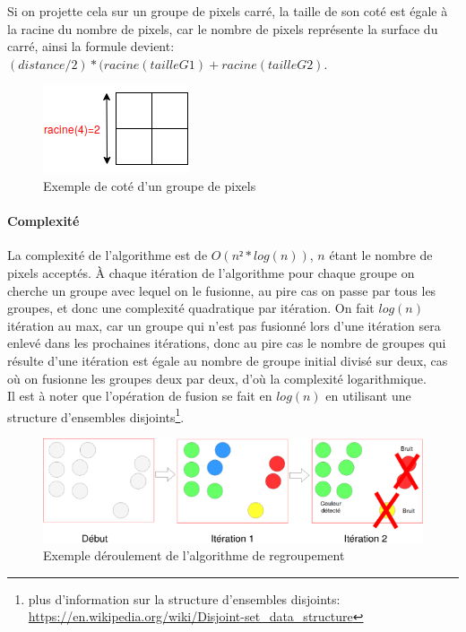 \documentclass[12pt]{report}
\begin{document}
	Si on projette cela sur un groupe de pixels carré, la taille de son coté est égale à la racine du nombre de pixels, car le nombre de pixels représente la surface du carré, ainsi la formule devient: \textbf{$(distance/2)*(racine(tailleG1)+racine(tailleG2)$}.
	\begin{figure}[H]
		\centering
		\includegraphics[scale=0.75]{imgs/GroupeSide.png}
		\caption{Exemple de coté d'un groupe de pixels}
		\label{fig:GroupeSide}
	\end{figure}
	\paragraph{Complexité}La complexité de l’algorithme est de $O(n²*log(n))$, $n$ étant le nombre de pixels acceptés. À chaque itération de l’algorithme pour chaque groupe on cherche un groupe avec lequel on le fusionne, au pire cas on passe par tous les groupes, et donc une complexité quadratique par itération. On fait $log(n)$ itération au max, car un groupe qui n’est pas fusionné lors d’une itération sera enlevé dans les prochaines itérations, donc au pire cas le nombre de groupes qui résulte d’une itération est égale au nombre de groupe initial divisé sur deux, cas où on fusionne les groupes deux par deux, d’où la complexité logarithmique.\\
	Il est à noter que l'opération de fusion se fait en $log(n)$ en utilisant une structure d'ensembles disjoints\footnote{plus d'information sur la structure d'ensembles disjoints: \href{https://en.wikipedia.org/wiki/Disjoint-set_data_structure}{https://en.wikipedia.org/wiki/Disjoint-set\_data\_structure}}.
	\begin{figure}[H]
		\centering
		\includegraphics[scale=0.75]{imgs/grouping1.png}
		\caption{Exemple déroulement de l'algorithme de regroupement}
		\label{fig:Grouping}
	\end{figure}
\end{document}
